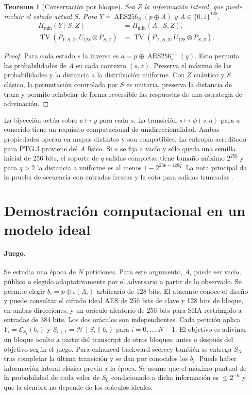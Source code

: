 \documentclass[11pt,a4paper]{article}
\newtheorem{theorem}{Teorema}
\newcommand{\bits}{\{0,1\}}
\newcommand{\hh}{H_{\min}}
\newcommand{\AES}{\operatorname{AES256}}
\newcommand{\TV}{\operatorname{TV}}
\begin{document}
\begin{theorem}[Conservación por bloque]
Sea $Z$ la información lateral, que puede incluir el estado actual $S$.
Para $Y=\AES_S(p\oplus A)$ y $A\in\bits^{128}$,
\[
\begin{aligned}
\hh(Y\mid S,Z)&=\hh(A\mid S,Z),\\
\TV(P_{Y,S,Z},U_{128}\otimes P_{S,Z})
  &=\TV(P_{A,S,Z},U_{128}\otimes P_{S,Z}).
\end{aligned}
\]
\end{theorem}
\begin{proof}
Para cada estado $s$ la inversa es
$a=p\oplus\AES_s^{-1}(y)$. Esto permuta las probabilidades de
$A$ en cada contexto $(s,z)$. Preserva el máximo de las
probabilidades y la distancia a la distribución uniforme.
Con $Z$ cuántico y $S$ clásico, la permutación controlada por $S$
es unitaria, preserva la distancia de traza y permite relabelar
de forma reversible las respuestas de una estrategia de adivinación.
\end{proof}

La biyección actúa sobre $a\mapsto y$ para cada $s$. La transición
$s\mapsto\phi(s,a)$ para $a$ conocido tiene un requisito
computacional de unidireccionalidad. Ambas propiedades operan en
mapas distintos y son compatibles. La entropía acreditada para PTG.3
proviene del $A$ físico. Si $a$ se fija a vacío y sólo queda una
semilla inicial de 256 bits, el soporte de $q$ salidas completas
tiene tamaño máximo $2^{256}$ y para $q>2$ la distancia a uniforme
es al menos $1-2^{256-128q}$. La nota principal da la prueba de
secuencia con entradas frescas y la cota para salidas truncadas
\cite[§§119, 390(iii), 397(ii), 402 y 996--998]{ais}.

\section{Demostración computacional en un modelo ideal}

\paragraph{Juego.}
Se estudia una época de $N$ peticiones. Para este argumento, $A_i$ puede
ser vacío, público o elegido adaptativamente por el adversario a partir de
lo observado. Se permite elegir $b_i=p\oplus\iota(A_i)$ arbitrario
de 128 bits. El atacante conoce el diseño y puede consultar el
cifrado ideal AES de 256 bits de clave y 128 bits de bloque, en
ambas direcciones, y un oráculo aleatorio de 256 bits para SHA
restringido a entradas de 384 bits. Los dos oráculos son
independientes. Cada petición aplica
$Y_i=\mathcal E_{S_i}(b_i)$ y
$S_{i+1}=\mathcal H(S_i\|b_i)$ para $i=0,\ldots,N-1$.
El objetivo es adivinar un bloque oculto a partir del transcript
de otros bloques, antes o después del objetivo según el juego.
Para enhanced backward secrecy también se entrega $S_N$ tras
completar la última transición y se dan por conocidos los $b_i$.
Puede haber información lateral clásica previa a la época.
Se asume que el máximo puntual de la probabilidad de cada valor
de $S_0$ condicionado a dicha información es $\le2^{-h}$ y que
la siembra no depende de los oráculos ideales.
\end{document}
